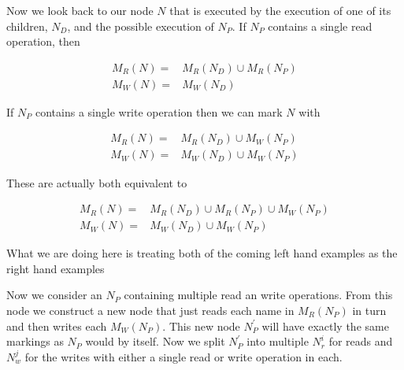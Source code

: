 \documentclass[twoside,a4paper]{report}
\begin{document}
Now we look back to our node $N$ that is executed by the execution of one of its children, $N_D$, and the possible execution of $N_P$. If $N_P$
contains a single read operation, then

\begin{align*}
M_R(N) =& M_R(N_D) \cup M_R(N_P) \\
M_W(N) =& M_W(N_D)
\end{align*}

If $N_P$ contains a single write operation then we can mark $N$ with

\begin{align*}
M_R(N) =& M_R(N_D) \cup M_W(N_P) \\
M_W(N) =& M_W(N_D) \cup M_W(N_P)
\end{align*}

These are actually both equivalent to

\begin{align*}
M_R(N) =& M_R(N_D) \cup M_R(N_P) \cup M_W(N_P) \\
M_W(N) =& M_W(N_D) \cup M_W(N_P)
\end{align*}

What we are doing here is treating both of the coming left hand examples as the right hand examples

\begin{minipage}[b]{0.4\linewidth}
\centering

\end{minipage}
\hspace{1cm}
\begin{minipage}[b]{0.5\linewidth}
\centering

\end{minipage}

\begin{minipage}[b]{0.4\linewidth}
\centering

\end{minipage}
\hspace{1cm}
\begin{minipage}[b]{0.5\linewidth}
\centering

\end{minipage}

Now we consider an $N_P$ containing multiple read an write operations. From this node we construct a new node that just reads each name in $M_R(N_P)$ in turn
and then writes each $M_W(N_P)$. This new node $N_P^\prime$ will have exactly the same markings as $N_P$ would by itself. Now we split $N_P^\prime$ into 
multiple $N_r^i$ for reads and $N_w^j$ for the writes with either a single read or write operation in each.
\end{document}
